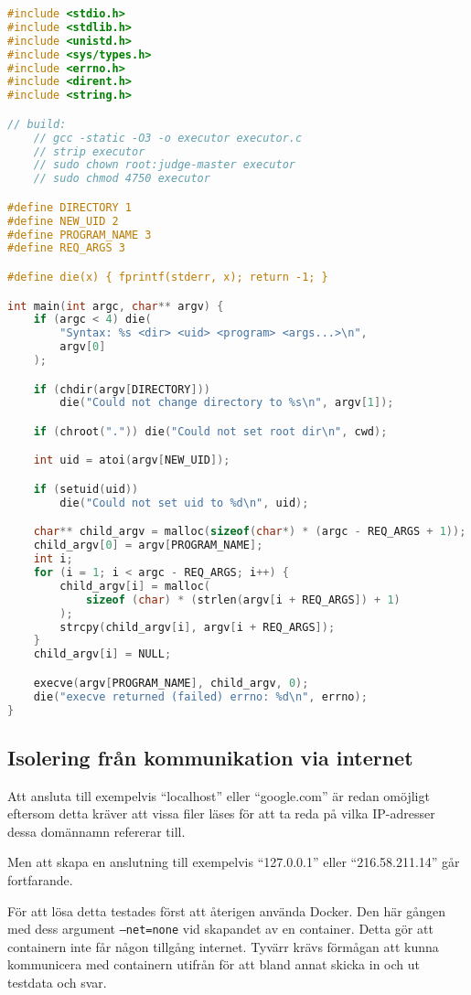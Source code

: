 \documentclass{article}
\begin{document}
\begin{lstlisting}[language=C]
#include <stdio.h>
#include <stdlib.h>
#include <unistd.h>
#include <sys/types.h>
#include <errno.h>
#include <dirent.h>
#include <string.h>

// build:
	// gcc -static -O3 -o executor executor.c
	// strip executor
	// sudo chown root:judge-master executor
	// sudo chmod 4750 executor

#define DIRECTORY 1
#define NEW_UID 2
#define PROGRAM_NAME 3
#define REQ_ARGS 3

#define die(x) { fprintf(stderr, x); return -1; }

int main(int argc, char** argv) {
	if (argc < 4) die(
		"Syntax: %s <dir> <uid> <program> <args...>\n",
		argv[0]
	);

	if (chdir(argv[DIRECTORY]))
		die("Could not change directory to %s\n", argv[1]);

	if (chroot(".")) die("Could not set root dir\n", cwd);

	int uid = atoi(argv[NEW_UID]);

	if (setuid(uid))
		die("Could not set uid to %d\n", uid);

	char** child_argv = malloc(sizeof(char*) * (argc - REQ_ARGS + 1));
	child_argv[0] = argv[PROGRAM_NAME];
	int i;
	for (i = 1; i < argc - REQ_ARGS; i++) {
		child_argv[i] = malloc(
			sizeof (char) * (strlen(argv[i + REQ_ARGS]) + 1)
		);
		strcpy(child_argv[i], argv[i + REQ_ARGS]);
	}
	child_argv[i] = NULL;

	execve(argv[PROGRAM_NAME], child_argv, 0);
	die("execve returned (failed) errno: %d\n", errno);
}
\end{lstlisting}

\subsection{Isolering från kommunikation via internet}

Att ansluta till exempelvis ``localhost'' eller ``google.com'' är redan omöjligt
eftersom detta kräver att vissa filer läses för att ta reda på vilka IP-adresser
dessa domännamn refererar till.

Men att skapa en anslutning till exempelvis ``127.0.0.1'' eller
``216.58.211.14'' går fortfarande.

För att lösa detta testades först att återigen använda Docker. Den här gången
med dess argument \texttt{--net=none} vid skapandet av en container. Detta gör
att containern inte får någon tillgång internet. Tyvärr krävs förmågan att kunna
kommunicera med containern utifrån för att bland annat skicka in och ut testdata
och svar.
\end{document}
